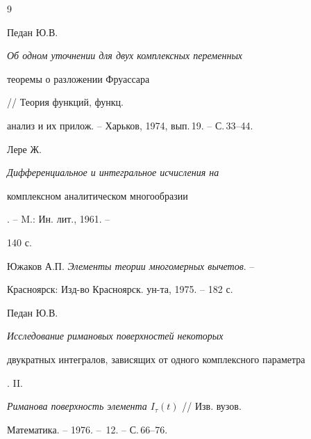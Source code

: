 \begin{thebibliography}{9} 


 




Педан Ю.В. {\em Об одном уточнении для двух комплексных переменных 


теоремы о разложении Фруассара} // Теория функций, функц. 


анализ и их прилож. -- Харьков, 1974, вып.\,19. -- С.\,33--44. 




Лере Ж. {\em Дифференциальное и интегральное исчисления на  


комплексном аналитическом многообразии}. -- M.: Ин. лит., 1961. -- 


140 с. 




Южаков А.П. {\em Элементы теории многомерных вычетов}. -- 


Красноярск: Изд-во Красноярск. ун-та, 1975. -- 182 с. 




Педан Ю.В. {\em Исследование римановых поверхностей некоторых  


двукратных интегралов, зависящих от одного комплексного параметра}. II. 


{\em Риманова поверхность элемента $I_\tau(t)$} // Изв. вузов.  


Математика. -- 1976. -- \No\,12. -- С.\,66--76. 


 


 


\end{thebibliography} 


 


\vskip 2cm 


 






 


\label{end} 


 


